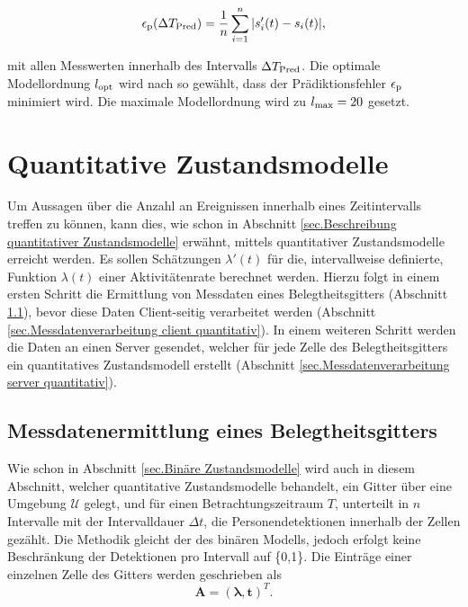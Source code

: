 \begin{equation}
	\label{eq:Prädiktionsfehler}
		\epsilon_{\mathrm{p}}(\Delta T_{\mathrm{Pred}}) = \frac{1}{n} \sum_{i=1}^{n} |s_i '(t) - s_i (t)| ,
	\end{equation}
	
mit allen Messwerten innerhalb des Intervalls $\Delta T_{\mathrm{Pred}}$. Die optimale Modellordnung $l_{\mathrm{opt}}$ wird nach \cite{Krajnik.2015} so gewählt, dass der Prädiktionsfehler $\epsilon_{\mathrm{p}}$ minimiert wird. Die maximale Modellordnung wird zu $l_{\mathrm{max}} = 20$ gesetzt. \\

\section{Quantitative Zustandsmodelle}
\label{sec.Quantitative Zustandsmodelle}
Um Aussagen über die Anzahl an Ereignissen innerhalb eines Zeitintervalls treffen zu können, kann dies, wie schon in Abschnitt \ref{sec.Beschreibung quantitativer Zustandsmodelle} erwähnt, mittels quantitativer Zustandsmodelle erreicht werden. Es sollen Schätzungen $\lambda'(t)$ für die, intervallweise definierte, Funktion $\lambda(t)$ einer Aktivitätenrate berechnet werden. Hierzu folgt in einem ersten Schritt die Ermittlung von Messdaten eines Belegtheitsgitters (Abschnitt \ref{sec.Messdatenermittlung quantitativ}), bevor diese Daten Client-seitig verarbeitet werden (Abschnitt \ref{sec.Messdatenverarbeitung client quantitativ}). In einem weiteren Schritt werden die Daten an einen Server gesendet, welcher für jede Zelle des Belegtheitsgitters ein quantitatives Zustandsmodell erstellt (Abschnitt \ref{sec.Messdatenverarbeitung server quantitativ}).
\subsection{Messdatenermittlung eines Belegtheitsgitters}
\label{sec.Messdatenermittlung quantitativ}

Wie schon in Abschnitt \ref{sec.Binäre Zustandsmodelle} wird auch in diesem Abschnitt, welcher quantitative Zustandsmodelle behandelt, ein Gitter über eine Umgebung $\mathcal{U}$ gelegt, und für einen Betrachtungszeitraum $T$, unterteilt in $n$ Intervalle mit der Intervalldauer $\Delta t$, die Personendetektionen innerhalb der Zellen gezählt. Die Methodik gleicht der des binären Modells, jedoch erfolgt keine Beschränkung der Detektionen pro Intervall auf \{0,1\}. Die Einträge einer einzelnen Zelle des Gitters werden geschrieben als
\begin{equation}
	\boldsymbol{A} = (\boldsymbol{\lambda}, \boldsymbol{t})^T .
	\label{eq:Zelleinträge quantitativer Fall}
\end{equation}

